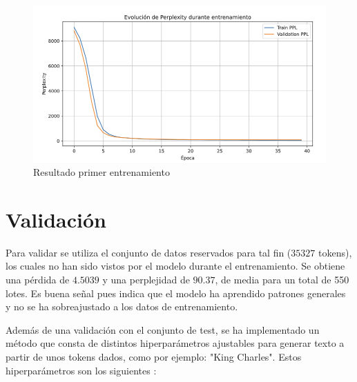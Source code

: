 \documentclass[11pt]{book}
\begin{document}
\begin{figure}[h]
    \centering
    \includegraphics[width=0.5\linewidth]{img/resultado_entrenamiento_v2.png}
    \caption{Resultado primer entrenamiento}
    \label{fig:placeholder25}
\end{figure}

\section{Validación}
Para validar se utiliza el conjunto de datos reservados para tal fin ($35327$ tokens), los cuales no han sido vistos por el modelo durante el entrenamiento. Se obtiene una pérdida de $4.5039$ y una perplejidad de $90.37$, de media para un total de 550 lotes. Es buena señal pues indica que el modelo ha aprendido patrones generales y no se ha sobreajustado a los datos de entrenamiento.

Además de una validación con el conjunto de test, se ha implementado un método que consta de distintos hiperparámetros ajustables para generar texto a partir de unos tokens dados, como por ejemplo: "King Charles". Estos hiperparámetros son los siguientes \parencite{vyas2025transformer_decoder_part3}: 
\end{document}
